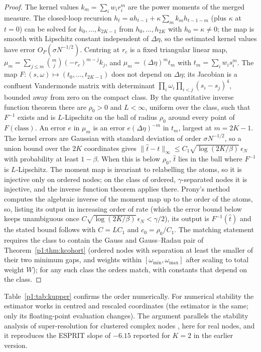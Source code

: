\begin{proof}
The kernel values $k_m=\sum_iw_ir_i^m$ are the power moments of the merged measure. The closed-loop recursion $h_t=ah_{t-1}+\kappa\sum_mk_mh_{t-1-m}$ (plus $\kappa$ at $t=0$) can be solved for $k_0,\ldots,k_{2K-1}$ from $h_0,\ldots,h_{2K}$ with $h_0=\kappa\ne0$; the map is smooth with Lipschitz constant independent of $\Delta\eta$, so the estimated kernel values have error $O_P(\sigma N^{-1/2})$. Centring at $r_c$ is a fixed triangular linear map, $\mu_m=\sum_{j\le m}\binom mj(-r_c)^{m-j}k_j$, and $\mu_m=(\Delta\eta)^m t_m$ with $t_m=\sum_iw_is_i^m$. The map $F:(s,\omega)\mapsto(t_0,\ldots,t_{2K-1})$ does not depend on $\Delta\eta$; its Jacobian is a confluent Vandermonde matrix with determinant $\prod_i\omega_i\prod_{i<j}(s_i-s_j)^4$, bounded away from zero on the compact class. By the quantitative inverse function theorem there are $\rho_0>0$ and $L<\infty$, uniform over the class, such that $F^{-1}$ exists and is $L$-Lipschitz on the ball of radius $\rho_0$ around every point of $F(\text{class})$. An error $e$ in $\mu_m$ is an error $e(\Delta\eta)^{-m}$ in $t_m$, largest at $m=2K-1$. The kernel errors are Gaussian with standard deviation of order $\sigma N^{-1/2}$, so a union bound over the $2K$ coordinates gives $\|\hat t-t\|_\infty\le C_1\sqrt{\log(2K/\beta)}\,\epsilon_N$ with probability at least $1-\beta$. When this is below $\rho_0$, $\hat t$ lies in the ball where $F^{-1}$ is $L$-Lipschitz. The moment map is invariant to relabelling the atoms, so it is injective only on ordered nodes; on the class of ordered, $\gamma$-separated nodes it is injective, and the inverse function theorem applies there. Prony's method computes the algebraic inverse of the moment map up to the order of the atoms, so, listing its output in increasing order of rate (which the error bound below keeps unambiguous once $C\sqrt{\log(2K/\beta)}\,\epsilon_N<\gamma/2$), its output is $F^{-1}(\hat t)$ and the stated bound follows with $C=LC_1$ and $c_0=\rho_0/C_1$. The matching statement requires the class to contain the Gauss and Gauss--Radau pair of Theorem~\ref{p1:thm:kcohort} (ordered nodes with separation at least the smaller of their two minimum gaps, and weights within $[\omega_{\min},\omega_{\max}]$ after scaling to total weight $W$); for any such class the orders match, with constants that depend on the class.
\end{proof}

Table~\ref{p1:tab:kupper} confirms the order numerically. For numerical stability the estimator works in centred and rescaled coordinates (the estimator is the same; only its floating-point evaluation changes). The argument parallels the stability analysis of super-resolution for clustered complex nodes \citep{p1:batenkov2021}, here for real nodes, and it reproduces the ESPRIT slope of $-6.15$ reported for $K=2$ in the earlier version.

